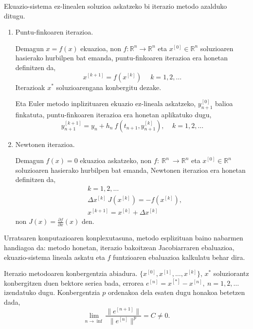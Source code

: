 Ekuazio-sistema ez-linealen soluzioa askatzeko bi iterazio metodo azalduko ditugu.

\begin{enumerate}

\item Puntu-finkoaren iterazioa.

Demagun $x=f(x)$ ekuazioa, non $f: {\mathbb{R}}^n  \longrightarrow {\mathbb{R}}^n$ eta  $x^{[0]} \in \mathbb{R}^n$ soluzioaren hasierako hurbilpen bat emanda, puntu-finkoaren iterazioa era honetan definitzen da,
\begin{equation*}
 x^{[k+1]}=f(x^{[k]}) \, \ \ \ \ \ k=1,2,\dots
\end{equation*}
Iterazioak $x^{\ast}$ soluzioarengana konbergitu dezake.

Eta  Euler metodo inplizituaren ekuazio ez-lineala askatzeko, $y_{n+1}^{[0]}$ balioa finkatuta, puntu-finkoaren iterazioa era honetan aplikatuko dugu, 
\begin{equation*}
y_{n+1}^{[k+1]}=y_{n}+h_n \ f(t_{n+1},y_{n+1}^{[k]}), \ \ \ \ \ k=1,2,\dots
\end{equation*}  

\item Newtonen iterazioa.

Demagun $f(x)=0$ ekuazioa askatzeko, non $f: \  {\mathbb{R}}^n \ \longrightarrow {\mathbb{R}}^n$ eta  $x^{[0]} \in \mathbb{R}^n$ soluzioaren hasierako hurbilpen bat emanda, Newtonen iterazioa era honetan definitzen da,
\begin{align*}
&k=1,2,\dots \\
&\Delta x^{[k]} \ J(x^{[k]})=-f(x^{[k]}), \\
&x^{[k+1]}=x^{[k]}+\Delta x^{[k]} 
\end{align*}
non $J(x)=\frac{\partial f}{\partial x} (x)$ den.

\end{enumerate}

Urratsaren konputazioaren konplexutasuna, metodo esplizituan baino nabarmen handiagoa da: metodo honetan, iterazio bakoitzean Jacobiarraren ebaluazioa, ekuazio-sistema lineala askatu eta $f$ funtzioaren ebaluazioa kalkulatu behar dira.

Iterazio metodoaren konbergentzia abiadura. $\{x^{[0]},x^{[1]},\dots,x^{[k]}\}$, $x^{\ast}$ soluziorantz konbergitzen duen bektore seriea bada, errorea $e^{[n]}=x^{[*]}-x^{[n]}, \ n=1,2,\dots$ izendatuko dugu. Konbergentzia $p$ ordenakoa dela esaten dugu honakoa betetzen dada,
\begin{equation*}
\lim\limits_{n\rightarrow \inf} \frac{\|e^{[n+1]}\|}{\|e^{[n]}\|^p}= C \ne 0.
\end{equation*}

